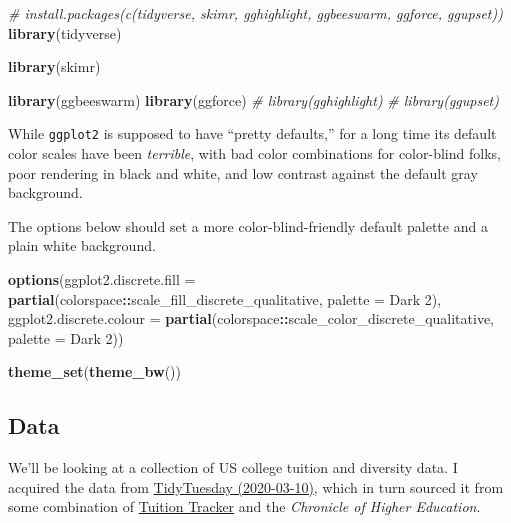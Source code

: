 \documentclass[
]{article}
\newenvironment{Shaded}{\begin{snugshade}}{\end{snugshade}}
\newcommand{\CommentTok}[1]{\textcolor[rgb]{0.56,0.35,0.01}{\textit{#1}}}
\newcommand{\DataTypeTok}[1]{\textcolor[rgb]{0.13,0.29,0.53}{#1}}
\newcommand{\KeywordTok}[1]{\textcolor[rgb]{0.13,0.29,0.53}{\textbf{#1}}}
\newcommand{\NormalTok}[1]{#1}
\newcommand{\OperatorTok}[1]{\textcolor[rgb]{0.81,0.36,0.00}{\textbf{#1}}}
\newcommand{\StringTok}[1]{\textcolor[rgb]{0.31,0.60,0.02}{#1}}
\begin{document}
\begin{Shaded}
\begin{Highlighting}[]
\CommentTok{\# install.packages(c(\textquotesingle{}tidyverse\textquotesingle{}, \textquotesingle{}skimr\textquotesingle{}, \textquotesingle{}gghighlight\textquotesingle{}, \textquotesingle{}ggbeeswarm\textquotesingle{}, \textquotesingle{}ggforce\textquotesingle{}, \textquotesingle{}ggupset\textquotesingle{}))}
\KeywordTok{library}\NormalTok{(tidyverse)}

\KeywordTok{library}\NormalTok{(skimr)}

\KeywordTok{library}\NormalTok{(ggbeeswarm)}
\KeywordTok{library}\NormalTok{(ggforce)}
\CommentTok{\# library(gghighlight)}
\CommentTok{\# library(ggupset)}
\end{Highlighting}
\end{Shaded}

While \texttt{ggplot2} is supposed to have ``pretty defaults,'' for a long time its default color scales have been \emph{terrible}, with bad color combinations for color-blind folks, poor rendering in black and white, and low contrast against the default gray background.

The options below should set a more color-blind-friendly default palette and a plain white background.

\begin{Shaded}
\begin{Highlighting}[]
\KeywordTok{options}\NormalTok{(}\DataTypeTok{ggplot2.discrete.fill =} \KeywordTok{partial}\NormalTok{(colorspace}\OperatorTok{::}\NormalTok{scale\_fill\_discrete\_qualitative, }\DataTypeTok{palette =} \StringTok{\textquotesingle{}Dark 2\textquotesingle{}}\NormalTok{), }
        \DataTypeTok{ggplot2.discrete.colour =} \KeywordTok{partial}\NormalTok{(colorspace}\OperatorTok{::}\NormalTok{scale\_color\_discrete\_qualitative, }\DataTypeTok{palette =} \StringTok{\textquotesingle{}Dark 2\textquotesingle{}}\NormalTok{))}

\KeywordTok{theme\_set}\NormalTok{(}\KeywordTok{theme\_bw}\NormalTok{())}
\end{Highlighting}
\end{Shaded}

\hypertarget{data-1}{%
\subsection{Data}\label{data-1}}

We'll be looking at a collection of US college tuition and diversity data. I acquired the data from \href{https://github.com/rfordatascience/tidytuesday/tree/master/data/2020/2020-03-10}{TidyTuesday (2020-03-10)}, which in turn sourced it from some combination of \href{https://www.tuitiontracker.org/}{Tuition Tracker} and the \emph{Chronicle of Higher Education}.
\end{document}
